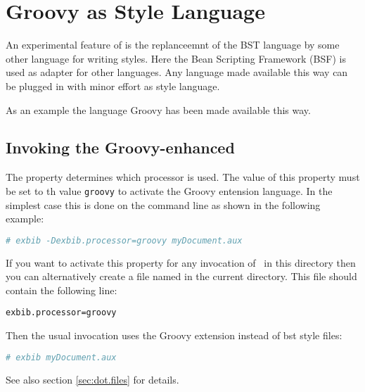 
\section{Groovy as Style Language}

An experimental feature of \ExBib{} is the replanceemnt of the BST
language by some other language for writing styles. Here the Bean
Scripting Framework (BSF) is used as adapter for other languages. Any
language made available this way can be plugged in with minor effort
as style language.

As an example the language Groovy has been made available this way.


\subsection{Invoking the Groovy-enhanced \ExBib}

The property  determines which processor is
used. The value of this property must be set to th value \verb|groovy|
to activate the Groovy entension language. In the simplest case this
is done on the command line as shown in the following example:

\begin{lstlisting}[language=sh]
# exbib -Dexbib.processor=groovy myDocument.aux
\end{lstlisting}

If you want to activate this property for any invocation of \ExBib\ in
this directory then you can alternatively create a file named
 in the current directory. This file should contain the
following line:

\begin{lstlisting}
exbib.processor=groovy
\end{lstlisting}

Then the usual invocation uses the Groovy extension instead of bst
style files:

\begin{lstlisting}[language=sh]
# exbib myDocument.aux
\end{lstlisting}

See also section \ref{sec:dot.files} for details.


